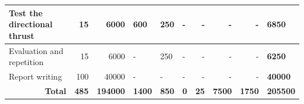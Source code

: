 \begin{table}[H]
\begin{tabular}{|p{3.5cm}|rr|p{8mm}|p{8mm}|p{7mm}|rrr|p{8.5mm}|}
    Test the directional thrust                                                              & \multicolumn{1}{r|}{15}                               & 6000                                               & 600                                                                                                     & 250                                                                                                    & -                                                                                                       & \multicolumn{1}{r|}{-}           & \multicolumn{1}{r|}{-}             & -                                      & \textbf{6850}                                        \\ \hline
    Evaluation and repetition                                                                & \multicolumn{1}{r|}{15}                               & 6000                                               & -                                                                                                       & 250                                                                                                    & -                                                                                                       & \multicolumn{1}{r|}{-}           & \multicolumn{1}{r|}{-}             & -                                      & \textbf{6250}                                        \\ \hline
    Report writing                                                                           & \multicolumn{1}{r|}{100}                              & 40000                                              & -                                                                                                       & -                                                                                                      & -                                                                                                       & \multicolumn{1}{r|}{-}           & \multicolumn{1}{r|}{-}             & -                                      & \textbf{40000}                                       \\ \hline
    \multicolumn{1}{|r|}{\textbf{Total}}                                                     & \multicolumn{1}{r|}{\textbf{485}}                     & \textbf{194000}                                    & \textbf{1400}                                                                                           & \textbf{850}                                                                                           & \textbf{0}                                                                                              & \multicolumn{1}{r|}{\textbf{25}} & \multicolumn{1}{r|}{\textbf{7500}} & \textbf{1750}                          & \textbf{205500}                                      \\ \hline
    \end{tabular}
    \end{table}
